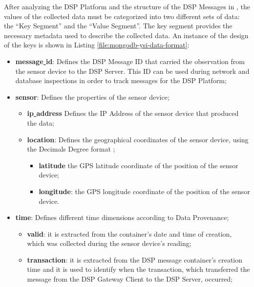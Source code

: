 After analyzing the DSP Platform and the structure of the DSP Messages in
\cite{netbeams-dsp-architecture}, the values of the collected data must be
categorized into two different sets of data: the ``Key Segment'' and the
``Value Segment''. The key segment provides the necessary metadata 
used to describe the collected data. An instance of the design of the 
keys is shown in Listing \ref{file:mongodb-ysi-data-format}:

\begin{itemize}
  \item \textbf{message\underline{ }id}: Defines the DSP Message ID that
  carried the observation from the sensor device to the DSP Server. This ID
  can be used during network and database inspections in order to track messages
  for the DSP Platform;
  \item \textbf{sensor}: Defines the properties of the sensor device;
    \begin{itemize}[label=\textbullet]
        \item \textbf{ip\underline{ }address} Defines the IP Address of the 
        sensor device that produced the data;
        \item \textbf{location}: Defines the geographical coordinates of the
        sensor device, using the Decimals Degree format \cite{decimal-degrees};
            \begin{itemize}[label=\textbullet]
                \item \textbf{latitude} the GPS latitude coordinate of the
                position of the sensor device;
                \item \textbf{longitude}: the GPS longitude coordinate of the
                position of the sensor device.
            \end{itemize}
    \end{itemize}
  \item \textbf{time}: Defines different time dimensions according to Data 
   Provenance;
    \begin{itemize}[label=\textbullet]
      \item \textbf{valid}: it is extracted from the container's date and time
      of creation, which was collected during the sensor device's reading;
      \item \textbf{transaction}: it is extracted from the DSP message
         container's creation time and it is used to identify when the
         transaction, which transferred the message from the DSP Gateway Client
         to the DSP Server, occurred;
    \end{itemize} 
\end{itemize}

